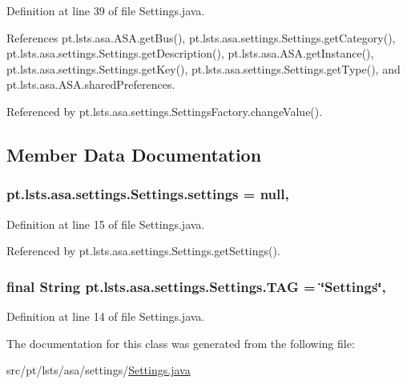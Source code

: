 Definition at line 39 of file Settings.\+java.



References pt.\+lsts.\+asa.\+A\+S\+A.\+get\+Bus(), pt.\+lsts.\+asa.\+settings.\+Settings.\+get\+Category(), pt.\+lsts.\+asa.\+settings.\+Settings.\+get\+Description(), pt.\+lsts.\+asa.\+A\+S\+A.\+get\+Instance(), pt.\+lsts.\+asa.\+settings.\+Settings.\+get\+Key(), pt.\+lsts.\+asa.\+settings.\+Settings.\+get\+Type(), and pt.\+lsts.\+asa.\+A\+S\+A.\+shared\+Preferences.



Referenced by pt.\+lsts.\+asa.\+settings.\+Settings\+Factory.\+change\+Value().



\subsection{Member Data Documentation}
\hypertarget{classpt_1_1lsts_1_1asa_1_1settings_1_1Settings_a2dc5edfa99b6440deb085ee9b010051f}{}
\subsubsection[{settings}]{ pt.\+lsts.\+asa.\+settings.\+Settings.\+settings = null\hspace{0.3cm}{\ttfamily [static]}, {\ttfamily [private]}}\label{classpt_1_1lsts_1_1asa_1_1settings_1_1Settings_a2dc5edfa99b6440deb085ee9b010051f}


Definition at line 15 of file Settings.\+java.



Referenced by pt.\+lsts.\+asa.\+settings.\+Settings.\+get\+Settings().

\hypertarget{classpt_1_1lsts_1_1asa_1_1settings_1_1Settings_afe525f965dac49df0ee4b379c021c21d}{}
\subsubsection[{T\+A\+G}]{\setlength{\rightskip}{0pt plus 5cm}final String pt.\+lsts.\+asa.\+settings.\+Settings.\+T\+A\+G = \char`\"{}Settings\char`\"{}\hspace{0.3cm}{\ttfamily [static]}, {\ttfamily [private]}}\label{classpt_1_1lsts_1_1asa_1_1settings_1_1Settings_afe525f965dac49df0ee4b379c021c21d}


Definition at line 14 of file Settings.\+java.



The documentation for this class was generated from the following file\+:\begin{DoxyCompactItemize}
\item 
src/pt/lsts/asa/settings/\hyperlink{Settings_8java}{Settings.\+java}\end{DoxyCompactItemize}
